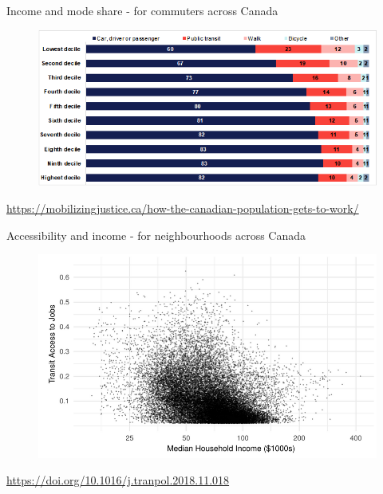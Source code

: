 \documentclass[aspectratio=169]{beamer}
\begin{document}
\begin{frame}
	
	Income and mode share - for commuters across Canada
	
	\begin{figure}
		\centering
		\includegraphics[width=0.94\linewidth]{images/income_mode_canada.png}
	\end{figure}
	
	\tiny\url{https://mobilizingjustice.ca/how-the-canadian-population-gets-to-work/}
	
\end{frame}










\begin{frame}
	
	Accessibility and income - for neighbourhoods across Canada
	
	\begin{figure}
		\centering
		\includegraphics[width=0.94\linewidth]{images/access_income.png}
	\end{figure}
	
	\tiny\url{https://doi.org/10.1016/j.tranpol.2018.11.018}
	
\end{frame}
\end{document}
